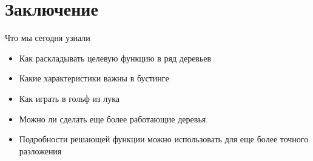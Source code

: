 \documentclass[14pt, fleqn, xcolor={dvipsnames, table}]{beamer}
\begin{document}
\section{Заключение}

\begin{frame}{Что мы сегодня узнали}
\begin{itemize}
  \item Как раскладывать целевую функцию в ряд деревьев
  \item Какие характеристики важны в бустинге
  \item Как играть в гольф из лука
  \item Можно ли сделать еще более работающие деревья
  \item Подробности решающей функции можно использовать для еще более точного разложения
\end{itemize}
\end{frame}
\end{document}
